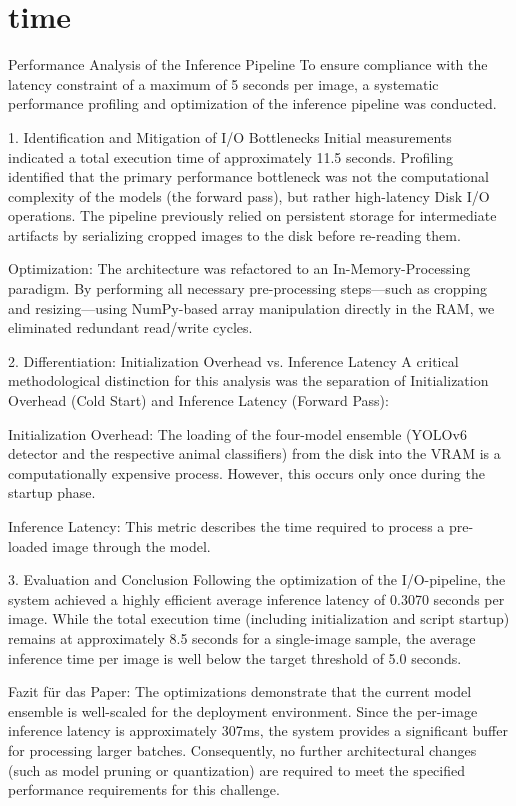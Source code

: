 \section{time}
\label{sec:time}

Performance Analysis of the Inference Pipeline
To ensure compliance with the latency constraint of a maximum of 5 seconds per image, a systematic performance profiling and optimization of the inference pipeline was conducted.

1. Identification and Mitigation of I/O Bottlenecks
Initial measurements indicated a total execution time of approximately 11.5 seconds. Profiling identified that the primary performance bottleneck was not the computational complexity of the models (the forward pass), but rather high-latency Disk I/O operations. The pipeline previously relied on persistent storage for intermediate artifacts by serializing cropped images to the disk before re-reading them.

Optimization: The architecture was refactored to an In-Memory-Processing paradigm. By performing all necessary pre-processing steps—such as cropping and resizing—using NumPy-based array manipulation directly in the RAM, we eliminated redundant read/write cycles.

2. Differentiation: Initialization Overhead vs. Inference Latency
A critical methodological distinction for this analysis was the separation of Initialization Overhead (Cold Start) and Inference Latency (Forward Pass):

Initialization Overhead: The loading of the four-model ensemble (YOLOv6 detector and the respective animal classifiers) from the disk into the VRAM is a computationally expensive process. However, this occurs only once during the startup phase.

Inference Latency: This metric describes the time required to process a pre-loaded image through the model.

3. Evaluation and Conclusion
Following the optimization of the I/O-pipeline, the system achieved a highly efficient average inference latency of 0.3070 seconds per image. While the total execution time (including initialization and script startup) remains at approximately 8.5 seconds for a single-image sample, the average inference time per image is well below the target threshold of 5.0 seconds.

Fazit für das Paper:
The optimizations demonstrate that the current model ensemble is well-scaled for the deployment environment. Since the per-image inference latency is approximately 307ms, the system provides a significant buffer for processing larger batches. Consequently, no further architectural changes (such as model pruning or quantization) are required to meet the specified performance requirements for this challenge.